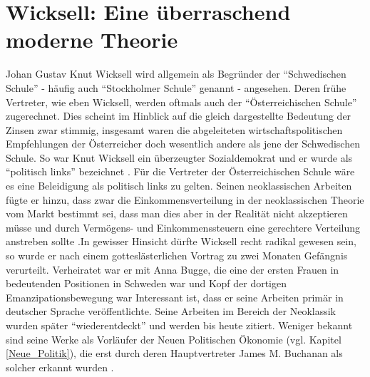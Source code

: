 \section{Wicksell: Eine überraschend moderne Theorie}
\label{Wicksell}

Johan Gustav Knut Wicksell wird allgemein als Begründer der "`Schwedischen Schule"' - häufig auch "`Stockholmer Schule"' genannt - angesehen. Deren frühe Vertreter, wie eben Wicksell, werden oftmals auch der "`Österreichischen Schule"' zugerechnet. Dies scheint im Hinblick auf die gleich dargestellte Bedeutung der Zinsen zwar stimmig, insgesamt waren die abgeleiteten wirtschaftspolitischen Empfehlungen der Österreicher doch wesentlich andere als jene der Schwedischen Schule. So war Knut Wicksell ein überzeugter Sozialdemokrat und er wurde als "`politisch links"' bezeichnet \parencite[S. 210, S. 192]{Grossekettler1989}. Für die Vertreter der Österreichischen Schule wäre es eine Beleidigung als politisch links zu gelten. Seinen neoklassischen Arbeiten fügte er hinzu, dass zwar die Einkommensverteilung in der neoklassischen Theorie vom Markt bestimmt sei, dass man dies aber in der Realität nicht akzeptieren müsse und durch Vermögens- und Einkommenssteuern eine gerechtere Verteilung anstreben sollte \parencite[S. 196]{Grossekettler1989}.In gewisser Hinsicht dürfte Wicksell recht radikal gewesen sein, so wurde er nach einem gotteslästerlichen Vortrag zu zwei Monaten Gefängnis verurteilt. Verheiratet war er mit Anna Bugge, die eine der ersten Frauen in bedeutenden Positionen in Schweden war und Kopf der dortigen Emanzipationsbewegung war \parencite[S. 191]{Grossekettler1989} Interessant ist, dass er seine Arbeiten primär in deutscher Sprache veröffentlichte. Seine Arbeiten im Bereich der Neoklassik wurden später "`wiederentdeckt"' und werden bis heute zitiert. Weniger bekannt sind seine Werke als Vorläufer der Neuen Politischen Ökonomie (vgl. Kapitel \ref{Neue_Politik}), die erst durch deren Hauptvertreter James M. Buchanan als solcher erkannt wurden \parencite[S. 8]{Buchanan1962}. 

